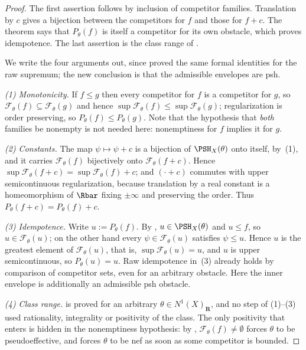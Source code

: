 \begin{proof}
The first assertion follows by inclusion of competitor families.
Translation by $c$ gives a bijection between the competitors for $f$ and
those for $f+c$.
The theorem says that $P_\theta(f)$ is itself a competitor for its own
obstacle, which proves idempotence.
The last assertion is the class range of
.

We write the four arguments out, since 
proved the same formal identities for the raw supremum; the new
conclusion is that the admissible envelopes are psh.

\emph{(1) Monotonicity.}  If $f\le g$ then every competitor for $f$ is a
competitor for $g$, so $\mathcal F_\theta(f)\subseteq\mathcal F_\theta(g)$ and hence
$\sup\mathcal F_\theta(f)\le\sup\mathcal F_\theta(g)$; regularization is order
preserving, so $P_\theta(f)\le P_\theta(g)$.  Note that the hypothesis
that \emph{both} families be nonempty is not needed here: nonemptiness for
$f$ implies it for $g$.

\emph{(2) Constants.}  The map $\psi\mapsto\psi+c$ is a bijection of
$\PSH_X(\theta)$ onto itself, by \,(1), and it
carries $\mathcal F_\theta(f)$ bijectively onto $\mathcal F_\theta(f+c)$.  Hence
$\sup\mathcal F_\theta(f+c)=\sup\mathcal F_\theta(f)+c$; and
$(\cdot+c)$ commutes with upper semicontinuous regularization, because
translation by a real constant is a homeomorphism of $\Rbar$ fixing
$\pm\infty$ and preserving the order.  Thus
$P_\theta(f+c)=P_\theta(f)+c$.

\emph{(3) Idempotence.}  Write $u:=P_\theta(f)$.  By
, $u\in\PSH_X(\theta)$ and $u\le f$, so
$u\in\mathcal F_\theta(u)$; on the other hand every $\psi\in\mathcal F_\theta(u)$
satisfies $\psi\le u$.  Hence $u$ is the greatest element of
$\mathcal F_\theta(u)$, that is, $\sup\mathcal F_\theta(u)=u$, and $u$ is upper
semicontinuous, so $P_\theta(u)=u$.  Raw idempotence in \,(3) already
holds by comparison of competitor sets, even for an arbitrary obstacle.
Here the inner envelope is additionally an admissible psh obstacle.

\emph{(4) Class range.}   is proved for an
arbitrary $\theta\in N^1(X)_{\mathbf R}$, and no step of (1)--(3) used
rationality, integrality or positivity of the class.  The only positivity
that enters is hidden in the nonemptiness hypothesis: by
, $\mathcal F_\theta(f)\ne\emptyset$ forces
$\theta$ to be pseudoeffective, and forces $\theta$ to be nef as soon as
some competitor is bounded.
\end{proof}

